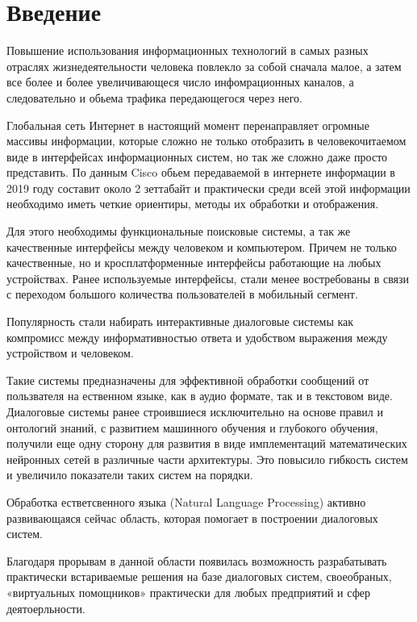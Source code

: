 \chapter*{Введение}
Повышение использования информационных технологий в самых разных отраслях жизнедеятельности человека повлекло за собой сначала малое, а затем все более и более увеличивающеся число инфомрационных каналов, а следовательно и обьема трафика передающегося через него.  

Глобальная сеть Интернет в настоящий момент перенаправляет огромные массивы информации, которые сложно не только отобразить в человекочитаемом виде в интерфейсах информационных систем, но так же сложно даже просто представить. 
По данным Cisco обьем передаваемой в интернете информации в 2019 году составит около 2 зеттабайт \cite{cisco2018cisco} и практически среди всей этой информации необходимо иметь четкие ориентиры, методы их обработки и отображения. 

Для этого необходимы функциональные поисковые системы, а так же качественные интерфейсы между человеком и компьютером. Причем не только качественные, но и кросплатформенные интерфейсы работающие на любых устройствах. Ранее используемые интерфейсы, стали менее востребованы в связи с переходом большого количества пользователей в мобильный сегмент. 

Популярность стали набирать интерактивные диалоговые системы как компромисс  между информативностью ответа и удобством выражения между устройством и человеком. 

Такие системы предназначены для эффективной обработки сообщений от пользвателя на ественном языке, как в аудио формате, так и в текстовом виде. Диалоговые системы ранее строившиеся исключительно на основе правил и онтологий знаний, с развитием машинного обучения и глубокого обучения, получили еще одну сторону для развития в виде имплементаций математических нейронных сетей в различные части архитектуры. Это повысило гибкость систем и увеличило показатели таких систем на порядки. 

Обработка естветсвенного языка (Natural Language Processing) активно развивающаяся сейчас область, которая помогает в построении диалоговых систем.

Благодаря прорывам в данной области появилась возможность разрабатывать практически встариваемые решения на базе диалоговых систем, своеобраных, «виртуальных помощников» практически для любых предприятий и сфер деятоерльности. 

